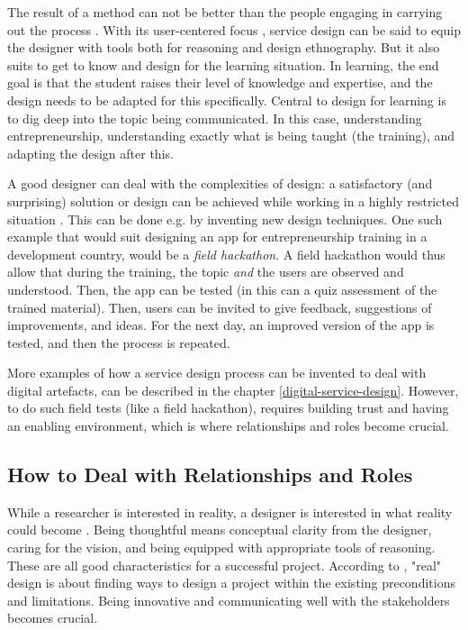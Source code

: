 The result of a method can not be better than the people engaging in carrying out the process \citep{lowgren}. With its user-centered focus \citep{stickdorn}, service design can be said to equip the designer with tools both for reasoning and design ethnography. But it also suits to get to know and design for the learning situation. In learning, the end goal is that the student raises their level of knowledge and expertise, and the design needs to be adapted for this specifically. Central to design for learning is to dig deep into the topic being communicated. In this case, understanding entrepreneurship, understanding exactly what is being taught (the training), and adapting the design after this.

A good designer can deal with the complexities of design: a satisfactory (and surprising) solution or design can be achieved while working in a highly restricted situation \citep{lowgren}. This can be done e.g. by inventing new design techniques. One such example that would suit designing an app for entrepreneurship training in a development country, would be a \textit{field hackathon}. A field hackathon would thus allow that during the training, the topic \textit{and} the users are observed and understood. Then, the app can be tested (in this can a quiz assessment of the trained material). Then, users can be invited to give feedback, suggestions of improvements, and  ideas. For the next day, an improved version of the app is tested, and then the process is repeated.

More examples of how a service design process can be invented to deal with digital artefacts, can be described in the chapter \ref{digital-service-design}. However, to do such field tests (like a field hackathon), requires building trust and having an enabling environment, which is where relationships and roles become crucial.

\subsection{How to Deal with Relationships and Roles}
While a researcher is interested in reality, a designer is interested in what reality could become \citep{lowgren}. Being thoughtful means conceptual clarity from the designer, caring for the vision, and being equipped with appropriate tools of reasoning. These are all good characteristics for a successful project. According to \cite{lowgren}, "real" design is about finding ways to design a project within the existing preconditions and limitations. Being innovative and communicating well with the stakeholders becomes crucial.

